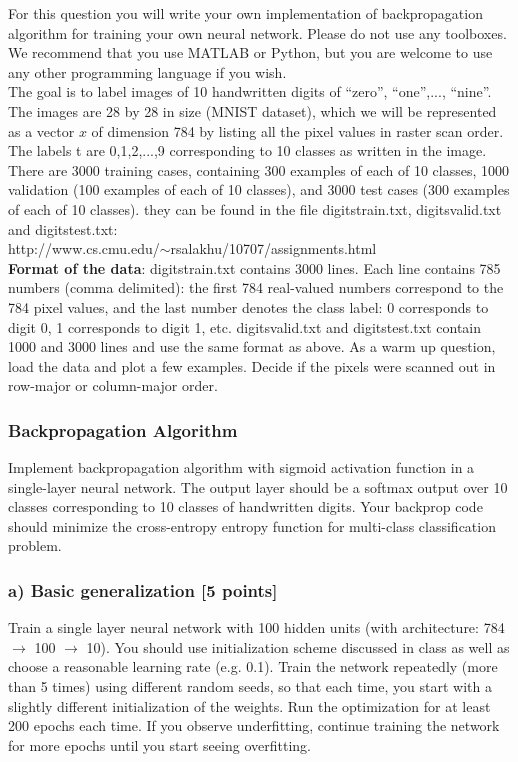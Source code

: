 \documentclass{article}
\begin{document}
For this question you will 
write your own implementation of backpropagation algorithm for 
training your own neural network.
Please do not use any toolboxes. 
We recommend that you use MATLAB or Python, but you are welcome
to use any other programming language if you wish. 
\\
 
The goal is to label images of
10 handwritten digits of ``zero'', ``one'',..., ``nine''.
The images are 28 by 28 in size (MNIST dataset), which we will be represented
as a vector $x$ of dimension 784 by listing all the pixel values in
raster scan order. The labels t are 0,1,2,...,9 corresponding to
10 classes as written in the image.
There are 3000 training cases, containing 300 examples of each of 10 
classes, 
1000 validation (100 examples of each of 10 classes), and 3000 
test cases (300 examples of each of 10 classes). 
they can be found in the file digitstrain.txt, digitsvalid.txt
 and digitstest.txt: \\
http://www.cs.cmu.edu/$\sim$rsalakhu/10707/assignments.html
\\

{\bf Format of the data}: digitstrain.txt contains 3000 lines.
Each line contains 785 numbers (comma delimited): 
the first 784 real-valued numbers
correspond to the
784 pixel values, and the last number denotes
the class label: 0 corresponds to digit 0, 1 corresponds to digit 1, etc. 
digitsvalid.txt and digitstest.txt contain 1000 and 3000 lines 
and use the same format as above.
As a warm up question, load the data and plot a few examples. Decide if the pixels were scanned out in row-major or column-major order.



\subsubsection*{Backpropagation Algorithm}
Implement backpropagation algorithm with sigmoid activation function 
in a single-layer neural network. The output layer should be 
a softmax output over 10 classes
corresponding to 10 classes of handwritten digits. 
Your backprop code should minimize the cross-entropy entropy function 
for multi-class classification problem.
 

\subsubsection*{a) Basic generalization [5 points]}
Train a single layer neural network with 100 hidden units
(with architecture: 784 $\rightarrow$ 100 $\rightarrow$  10).  
You should
use initialization scheme discussed in class as well as choose a reasonable 
learning rate (e.g. 0.1). Train the network 
repeatedly (more than 5 times) using different random seeds, 
so that each time, you start with a slightly different initialization of 
the weights. 
Run the optimization for at least 200 epochs each time.
If you observe underfitting, continue training the network
for more epochs until you start seeing overfitting.
\\
  
\end{document}
